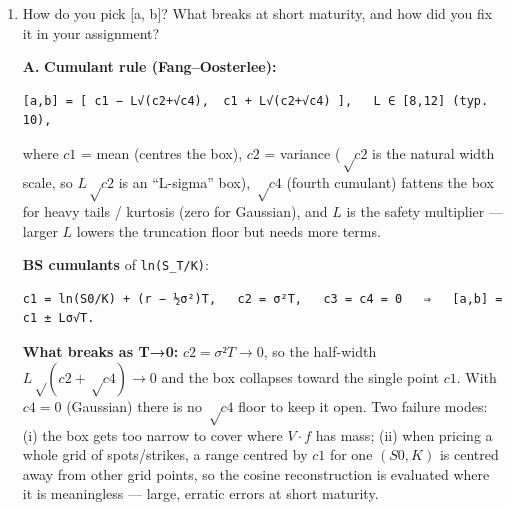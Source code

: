 \documentclass[
  11pt,
]{article}
\begin{document}
\begin{enumerate}
\begin{verbatim}
V_k^call = (2/(b-a)) K [ χ_k(0,b) − ψ_k(0,b) ].
\end{verbatim}

  \textbf{Step 5 --- assemble.} Insert the expansion, swap \(Σ\)/\(∫\)
  (uniform convergence of the cosine series for smooth \(f\)), and use
  \(V_k\):

\begin{verbatim}
P ≈ e^{-rT} (b-a)/2 Σ'_{k=0}^{N-1} A_k V_k.
\end{verbatim}

  Since
  \texttt{(b-a)/2\ ·\ A\_k\ =\ Re\{φ(kπ/(b-a);x0)\ e\^{}\{-ikπa/(b-a)\}\}},
  this is

\begin{verbatim}
P ≈ e^{-rT} Σ'_{k=0}^{N-1} Re{ φ(kπ/(b-a); x0) exp(-ikπ a/(b-a)) } V_k.
\end{verbatim}

  \textbf{Where the cf enters:} in exactly one place --- as the cosine
  coefficients of the density,
  \texttt{Re\{φ\ ·\ e\^{}\{-ikπa/(b-a)\}\}}. The spot dependence sits
  inside \(φ(·;x0)\); for BS/Lévy \(φ(u;x0)=φ_lvl(u) e^{iux0}\), so one
  set of \({V_k}\) prices the whole spot/strike grid (only the cheap
  \(e^{iux0}\) changes). Cost \(O(N)\), no integration, no FFT.
\item
  How do you pick {[}a, b{]}? What breaks at short maturity, and how did
  you fix it in your assignment?

  \textbf{A.} \textbf{Cumulant rule (Fang--Oosterlee):}

\begin{verbatim}
[a,b] = [ c1 − L√(c2+√c4),  c1 + L√(c2+√c4) ],   L ∈ [8,12] (typ. 10),
\end{verbatim}

  where \(c1\) = mean (centres the box), \(c2\) = variance (\(√c2\) is
  the natural width scale, so \(L√c2\) is an ``L-sigma'' box), \(√c4\)
  (fourth cumulant) fattens the box for heavy tails / kurtosis (zero for
  Gaussian), and \(L\) is the safety multiplier --- larger \(L\) lowers
  the truncation floor but needs more terms.

  \textbf{BS cumulants} of \texttt{ln(S\_T/K)}:

\begin{verbatim}
c1 = ln(S0/K) + (r − ½σ²)T,   c2 = σ²T,   c3 = c4 = 0   ⇒   [a,b] = c1 ± Lσ√T.
\end{verbatim}

  \textbf{What breaks as T→0:} \(c2 = σ²T → 0\), so the half-width
  \(L√(c2+√c4) → 0\) and the box collapses toward the single point
  \(c1\). With \(c4=0\) (Gaussian) there is no \(√c4\) floor to keep it
  open. Two failure modes: (i) the box gets too narrow to cover where
  \(V·f\) has mass; (ii) when pricing a whole grid of spots/strikes, a
  range centred by \(c1\) for one \((S0,K)\) is centred away from other
  grid points, so the cosine reconstruction is evaluated where it is
  meaningless --- large, erratic errors at short maturity.


\end{enumerate}
\end{document}
